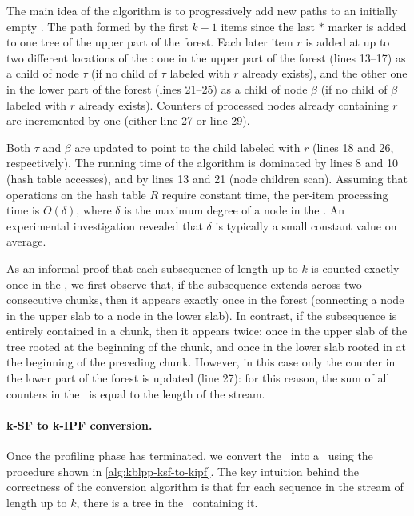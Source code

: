 \noindent
The main idea of the algorithm is to progressively add new paths to an initially empty \ksf. The path formed by the first $k-1$ items since the last $*$ marker is added to one tree of the upper part of the forest. Each later item $r$ is added at up to two different locations of the \ksf: one in the upper part of the forest (lines 13--17) as a child of node $\tau$ (if no child of $\tau$ labeled with $r$ already exists), and the other one in the lower part of the forest (lines 21--25) as a child of node $\beta$ (if no child of $\beta$ labeled with $r$ already exists). Counters of processed nodes already containing $r$ are incremented by one (either line 27 or line 29).

Both $\tau$ and $\beta$ are updated to point to the child labeled with $r$ (lines 18 and 26, respectively). The running time of the algorithm is dominated by lines 8 and 10 (hash table accesses), and by lines 13 and 21 (node children scan). Assuming that operations on the hash table $R$ require constant time, the per-item processing time is $O(\delta)$, where $\delta$ is the maximum degree of a node in the \ksf. An experimental investigation revealed that $\delta$ is typically a small constant value on average.

As an informal proof that each subsequence of length up to $k$ is counted exactly once in the \ksf, we first observe that, if the subsequence extends across two consecutive chunks, then it appears exactly once in the forest (connecting a node in the upper slab to a node in the lower slab). In contrast, if the subsequence is entirely contained in a chunk, then it appears twice: once in the upper slab of the tree rooted at the beginning of the chunk, and once in the lower slab rooted in at the beginning of the preceding chunk. However, in this case only the counter in the lower part of the forest is updated (line 27): for this reason, the sum of all counters in the \ksf\ is equal to the length of the stream.

\paragraph*{k-SF to k-IPF conversion.} Once the profiling phase has terminated,
we convert the \ksf\ into a \kipf\ using the procedure
shown in \myalgorithm\ref{alg:kblpp-ksf-to-kipf}.
The key intuition behind the correctness of the conversion algorithm is that for each sequence in the stream of length up to $k$, there is a tree in the \ksf\ containing it.

